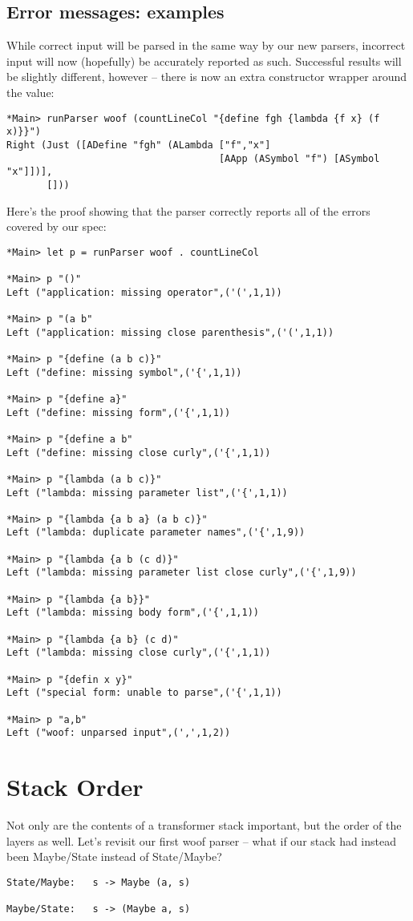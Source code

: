 \documentclass{tmr}
\begin{document}
\subsection{Error messages:  examples}
While correct input will be parsed in the same way by our new parsers, incorrect input will now (hopefully) be
accurately reported as such.  Successful results will be slightly different, however -- there is now an extra
constructor wrapper around the value:
\begin{verbatim}
*Main> runParser woof (countLineCol "{define fgh {lambda {f x} (f x)}}")
Right (Just ([ADefine "fgh" (ALambda ["f","x"] 
                                     [AApp (ASymbol "f") [ASymbol "x"]])],
       []))
\end{verbatim}
Here's the proof showing that the parser correctly reports all of the errors 
covered by our spec:
\begin{verbatim}
*Main> let p = runParser woof . countLineCol

*Main> p "()"
Left ("application: missing operator",('(',1,1))

*Main> p "(a b"
Left ("application: missing close parenthesis",('(',1,1))

*Main> p "{define (a b c)}"
Left ("define: missing symbol",('{',1,1))

*Main> p "{define a}"
Left ("define: missing form",('{',1,1))

*Main> p "{define a b"
Left ("define: missing close curly",('{',1,1))

*Main> p "{lambda (a b c)}"
Left ("lambda: missing parameter list",('{',1,1))

*Main> p "{lambda {a b a} (a b c)}"
Left ("lambda: duplicate parameter names",('{',1,9))

*Main> p "{lambda {a b (c d)}"
Left ("lambda: missing parameter list close curly",('{',1,9))

*Main> p "{lambda {a b}}"
Left ("lambda: missing body form",('{',1,1))

*Main> p "{lambda {a b} (c d)"
Left ("lambda: missing close curly",('{',1,1))

*Main> p "{defin x y}"
Left ("special form: unable to parse",('{',1,1))

*Main> p "a,b"
Left ("woof: unparsed input",(',',1,2))
\end{verbatim}




\section{Stack Order}
Not only are the contents of a transformer stack important, but the order of the
layers as well.  Let's revisit our first woof parser -- what if our stack had
instead been Maybe/State instead of State/Maybe?
\begin{verbatim}
State/Maybe:   s -> Maybe (a, s)

Maybe/State:   s -> (Maybe a, s)
\end{verbatim}
\end{document}
